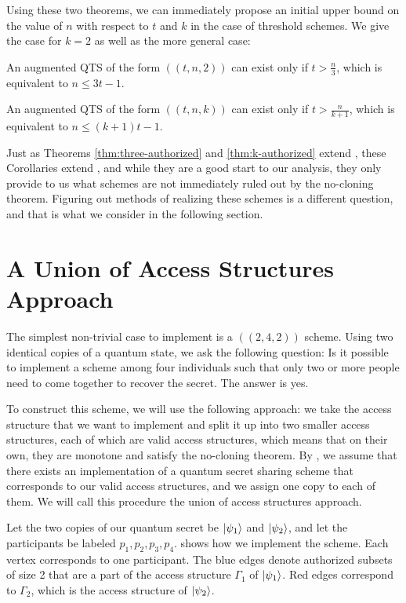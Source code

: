 Using these two theorems, we can immediately propose an initial upper bound on the value of $n$ with respect to $t$ and $k$ in the case of threshold schemes. We give the case for $k=2$ as well as the more general case:

\begin{corollary}
	\label{cor:qts2}
	An augmented QTS of the form $((t,n, 2))$ can exist only if $t > \frac{n}{3}$, which is equivalent to $n \leq 3t-1$.
\end{corollary}

\begin{corollary}
	\label{cor:qtsk}
	An augmented QTS of the form $((t,n, k))$ can exist only if $t > \frac{n}{k+1}$, which is equivalent to $n \leq (k+1)t-1$.
\end{corollary}

Just as Theorems \ref{thm:three-authorized} and \ref{thm:k-authorized} extend , these Corollaries extend , and while they are a good start to our analysis, they only provide to us what schemes are not immediately ruled out by the no-cloning theorem. Figuring out methods of realizing these schemes is a different question, and that is what we consider in the following section.

\section{A Union of Access Structures Approach}
\label{sec:union-access-structures}

The simplest non-trivial case to implement is a $((2,4,2))$ scheme. Using two identical copies of a quantum state, we ask the following question: Is it possible to implement a scheme among four individuals such that only two or more people need to come together to recover the secret. The answer is yes.

To construct this scheme, we will use the following approach: we take the access structure that we want to implement and split it up into two smaller access structures, each of which are valid access structures, which means that on their own, they are monotone and satisfy the no-cloning theorem. By , we assume that there exists an implementation of a quantum secret sharing scheme that corresponds to our valid access structures, and we assign one copy to each of them. We will call this procedure the union of access structures approach.

Let the two copies of our quantum secret be $\ket{\psi_1}$ and $\ket{\psi_2}$, and let the participants be labeled $p_1, p_2, p_3, p_4$.  shows how we implement the scheme. Each vertex corresponds to one participant. The blue edges denote authorized subsets of size 2 that are a part of the access structure $\Gamma_1$ of $\ket{\psi_1}$. Red edges correspond to $\Gamma_2$, which is the access structure of $\ket{\psi_2}$.


